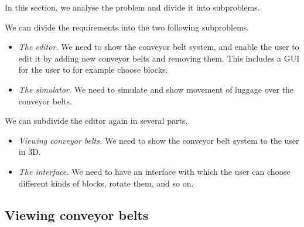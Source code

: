 In this section, we analyse the problem and divide it into subproblems.

We can divide the requirements into the two following subproblems.
\begin{itemize}
 \item \emph{The editor.} We need to show the conveyor belt system, and enable the user to edit it by adding new conveyor belts and removing them. This includes a GUI for the user to for example choose blocks.
 \item \emph{The simulator.} We need to simulate and show movement of luggage over the conveyor belts.
\end{itemize}
We can subdivide the editor again in several parts.
\begin{itemize}
 \item \emph{Viewing conveyor belts.} We need to show the conveyor belt system to the user in 3D.
 \item \emph{The interface.} We need to have an interface with which the user can choose different kinds of blocks, rotate them, and so on.
\end{itemize}

\subsection{Viewing conveyor belts}
